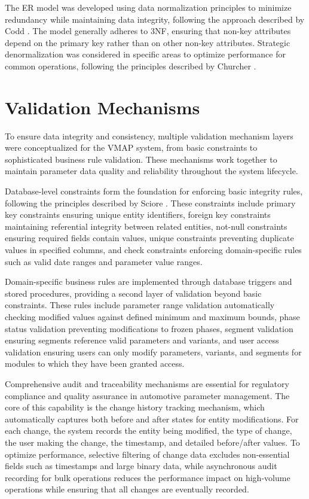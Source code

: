 The \ac{ER} model was developed using data normalization principles to minimize redundancy while maintaining data integrity, following the approach described by Codd \cite{codd1970relational}. The model generally adheres to \ac{3NF}, ensuring that non-key attributes depend on the primary key rather than on other non-key attributes. Strategic denormalization was considered in specific areas to optimize performance for common operations, following the principles described by Churcher \cite{churcher2008beginning}.

\section{Validation Mechanisms}
\label{sec:validation-mechanisms}

To ensure data integrity and consistency, multiple validation mechanism layers were conceptualized for the \ac{VMAP} system, from basic constraints to sophisticated business rule validation. These mechanisms work together to maintain parameter data quality and reliability throughout the system lifecycle.

Database-level constraints form the foundation for enforcing basic integrity rules, following the principles described by Sciore \cite{sciore2009database}. These constraints include primary key constraints ensuring unique entity identifiers, foreign key constraints maintaining referential integrity between related entities, not-null constraints ensuring required fields contain values, unique constraints preventing duplicate values in specified columns, and check constraints enforcing domain-specific rules such as valid date ranges and parameter value ranges.

Domain-specific business rules are implemented through database triggers and stored procedures, providing a second layer of validation beyond basic constraints. These rules include parameter range validation automatically checking modified values against defined minimum and maximum bounds, phase status validation preventing modifications to frozen phases, segment validation ensuring segments reference valid parameters and variants, and user access validation ensuring users can only modify parameters, variants, and segments for modules to which they have been granted access.

Comprehensive audit and traceability mechanisms are essential for regulatory compliance and quality assurance in automotive parameter management. The core of this capability is the change history tracking mechanism, which automatically captures both before and after states for entity modifications. For each change, the system records the entity being modified, the type of change, the user making the change, the timestamp, and detailed before/after values. To optimize performance, selective filtering of change data excludes non-essential fields such as timestamps and large binary data, while asynchronous audit recording for bulk operations reduces the performance impact on high-volume operations while ensuring that all changes are eventually recorded.